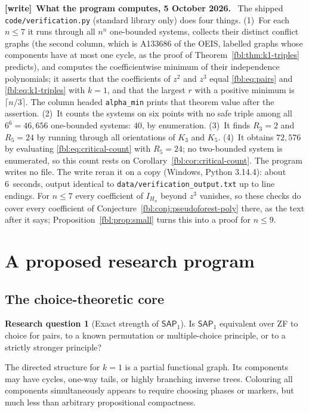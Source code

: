 \documentclass[11pt]{article}
\theoremstyle{definition}
\newtheorem{question}[theorem]{Research question}
\theoremstyle{remark}
\newcommand{\SAP}{\mathsf{SAP}}
\newcommand{\file}[1]{\nolinkurl{#1}}
\newenvironment{writenote}[1][]{\par\smallskip\begingroup\small
 \noindent\textbf{[write]}\if\relax\detokenize{#1}\relax\else~\textbf{#1.}\fi\ }%
 {\par\endgroup\smallskip}
\begin{document}
\begin{writenote}[What the program computes, 5 October 2026]
The shipped \file{code/verification.py} (standard library only) does four
things. (1)~For each $n\le7$ it runs through all $n^n$ one-bounded systems,
collects their distinct conflict graphs (the second column, which is
A133686 of the OEIS, labelled graphs whose components have at most one
cycle, as the proof of Theorem~\ref{fbl:thm:k1-triples} predicts), and
computes the coefficientwise minimum of their independence polynomials; it
asserts that the coefficients of $z^2$ and $z^3$ equal
\eqref{fbl:eq:pairs} and \eqref{fbl:eq:k1-triples} with $k=1$, and that
the largest $r$ with a positive minimum is $\lceil n/3\rceil$. The column
headed \texttt{alpha\_min} prints that theorem value after the assertion.
(2)~It counts the systems on six points with no safe triple among all
$6^6=46{,}656$ one-bounded systems: $40$, by enumeration. (3)~It finds
$R_3=2$ and $R_5=24$ by running through all orientations of $K_3$ and
$K_5$. (4)~It obtains $72{,}576$ by evaluating
\eqref{fbl:eq:critical-count} with $R_5=24$; no two-bounded system is
enumerated, so this count rests on Corollary~\ref{fbl:cor:critical-count}.
The program writes no file. The write reran it on a copy (Windows, Python
3.14.4): about 6~seconds, output identical to
\file{data/verification_output.txt} up to line endings. For $n\le7$ every
coefficient of $I_{H_n}$ beyond $z^3$ vanishes, so these checks do cover
every coefficient of Conjecture~\ref{fbl:conj:pseudoforest-poly} there, as
the text after it says; Proposition~\ref{fbl:prop:small} turns this into a
proof for $n\le9$.
\end{writenote}

\section{A proposed research program}\label{fbl:sec:questions}

\subsection{The choice-theoretic core}

\begin{question}[Exact strength of $\SAP_1$]\label{fbl:q:sap1}
Is $\SAP_1$ equivalent over ZF to choice for pairs, to a known permutation
or multiple-choice principle, or to a strictly stronger principle?
\end{question}

The directed structure for $k=1$ is a partial functional graph.  Its
components may have cycles, one-way tails, or highly branching inverse
trees.  Colouring all components simultaneously appears to require choosing
phases or markers, but much less than arbitrary propositional compactness.
\end{document}
